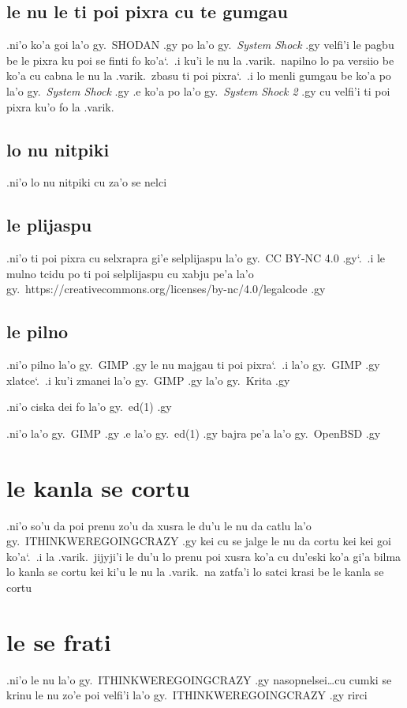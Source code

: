 \documentclass{report}
\newcommand\sds{\spacefactor\sfcode`.\ \space}
\begin{document}
\subsection{le nu le ti poi pixra cu te gumgau}
.ni'o ko'a goi la'o gy.\ SHODAN .gy po la'o gy.\ \textit{System Shock} .gy velfi'i le pagbu be le pixra ku poi se finti fo ko'a\sds  .i ku'i le nu la .varik.\ napilno lo pa versiio be ko'a cu cabna le nu la .varik.\ zbasu ti poi pixra\sds  .i lo menli gumgau be ko'a po la'o gy.\ \textit{System Shock} .gy .e ko'a po la'o gy.\ \textit{System Shock 2} .gy cu velfi'i ti poi pixra ku'o fo la .varik.
\subsection{lo nu nitpiki}
.ni'o lo nu nitpiki cu za'o se nelci

\subsection{le plijaspu}
.ni'o ti poi pixra cu selxrapra gi'e selplijaspu la'o gy.\ CC BY-NC 4.0 .gy\sds  .i le mulno tcidu po ti poi selplijaspu cu xabju pe'a la'o gy.\ https://creativecommons.org/licenses/by-nc/4.0/legalcode .gy

\subsection{le pilno}
.ni'o pilno la'o gy.\ GIMP .gy le nu majgau ti poi pixra\sds  .i  la'o gy.\ GIMP .gy xlatce\sds  .i ku'i zmanei la'o gy.\ GIMP .gy la'o gy.\ Krita .gy

.ni'o ciska dei fo la'o gy.\ ed(1) .gy

.ni'o la'o gy.\ GIMP .gy .e la'o gy.\ ed(1) .gy bajra pe'a la'o gy.\ OpenBSD .gy

\section{le kanla se cortu}
.ni'o so'u da poi prenu zo'u da xusra le du'u le nu da catlu la'o gy.\ ITHINKWEREGOINGCRAZY .gy kei cu se jalge le nu da cortu kei kei goi ko'a\sds  .i la .varik.\ jijyji'i le du'u lo prenu poi xusra ko'a cu du'eski ko'a gi'a bilma lo kanla se cortu kei ki'u le nu la .varik.\ na zatfa'i lo satci krasi be le kanla se cortu

\section{le se frati}
.ni'o le nu la'o gy.\ ITHINKWEREGOINGCRAZY .gy nasopnelsei\ldots cu cumki se krinu le nu zo'e poi velfi'i la'o gy.\ ITHINKWEREGOINGCRAZY .gy rirci
\end{document}
